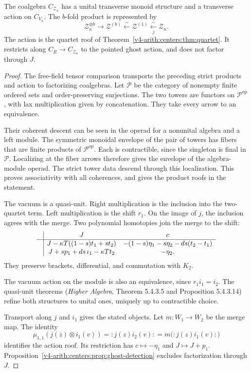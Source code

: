 \begin{theorem}
\label{v4-arith:centers:thm:cochain-monoid}
The coalgebra $C_{\mathcal Z_\kappa}$ has a unital transverse
monoid structure and a transverse action on $C_{V_\kappa}$.
The $b$-fold product is represented by
\[
 \mathcal Z_\kappa^{\otimes b}\longrightarrow\mathcal Z^{(b)}
 \xleftarrow{\sim}\mathcal Z^{(1)}
 \xleftarrow[\ j\ ]{\sim}\mathcal Z_\kappa.
\]
The action is the quartet roof of
Theorem~\ref{v4-arith:centers:thm:quartet}.
It restricts along $C_R\to C_{\mathcal Z_\kappa}$ to the
pointed ghost action, and does not factor through $J$.
\end{theorem}

\begin{proof}
The free-field tensor comparison transports the preceding
strict products and action to factorizing coalgebras.
Let $\mathcal P$ be the category of nonempty finite ordered
sets and order-preserving surjections.
The two towers are functors on $\mathcal P^{\mathrm{op}}$,
with lax multiplication given by concatenation.
They take every arrow to an equivalence.

Their coherent descent can be seen in the operad for a
nonunital algebra and a left module.
The symmetric monoidal envelope of the pair of towers has
fibers that are finite products of $\mathcal P^{\mathrm{op}}$.
Each is contractible, since the singleton is final in
$\mathcal P$. Localizing at the fiber arrows therefore gives
the envelope of the algebra-module operad.
The strict tower data descend through this localization.
This proves associativity with all coherences, and gives
the product roofs in the statement.

The vacuum is a quasi-unit. Right multiplication is the
inclusion into the two-quartet term. Left multiplication is
the shift $r_1$. On the image of $j$, the inclusion agrees
with the merge. Two polynomial homotopies join the merge
to the shift:
\[
 \begin{array}{c|cc}
 &J&c\\ \hline
 &J-\kappa T((1-s)t_1+st_2)
 &-(1-s)\eta_1-s\eta_2-ds(t_2-t_1)\\
 &J+sp_1+ds\,\iota_1-\kappa Tt_2&-\eta_2.
 \end{array}
\]
They preserve brackets, differential, and commutation with
$K_2$.

The vacuum action on the module is also an equivalence,
since $r_1i_1=i_2$.
The quasi-unit theorems
(\emph{Higher Algebra}, Theorem 5.4.3.5 and
Proposition 5.4.3.14) refine both structures to unital ones,
uniquely up to contractible choice.

Transport along $j$ and $i_1$ gives the stated objects.
Let $m:W_1\to W_2$ be the merge map.
The identity
\[
 \mu_{1,1}(j(z)\otimes i_1(v))
 =:j(z)i_2(v):
 =m\bigl(:j(z)i_1(v):\bigr)
\]
identifies the action roof. Its restriction has
$c\mapsto-\eta_1$ and $J\mapsto J+p_1$.
Proposition~\ref{v4-arith:centers:prop:ghost-detection}
excludes factorization through $J$.
\end{proof}

